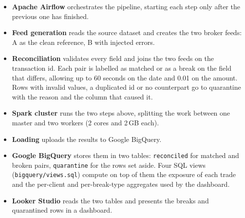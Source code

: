 \documentclass[11pt,a4paper]{article}
\newcommand{\code}[1]{\texttt{#1}}
\begin{document}
\begin{itemize}
  \item \textbf{Apache Airflow} orchestrates the pipeline, starting each step only after the previous one has finished.
  \item \textbf{Feed generation} reads the source dataset and creates the two broker feeds: A as the clean reference, B with injected errors.
  \item \textbf{Reconciliation} validates every field and joins the two feeds on the transaction id. Each pair is labelled as matched or as a break on the field that differs, allowing up to 60 seconds on the date and 0.01 on the amount. Rows with invalid values, a duplicated id or no counterpart go to quarantine with the reason and the column that caused it.
  \item \textbf{Spark cluster} runs the two steps above, splitting the work between one master and two workers (2 cores and 2\,GB each).
  \item \textbf{Loading} uploads the results to Google BigQuery.
  \item \textbf{Google BigQuery} stores them in two tables: \code{reconciled} for matched and broken pairs, \code{quarantine} for the rows set aside. Four SQL views (\code{bigquery/views.sql}) compute on top of them the exposure of each trade and the per-client and per-break-type aggregates used by the dashboard.
  \item \textbf{Looker Studio} reads the two tables and presents the breaks and quarantined rows in a dashboard.
\end{itemize}
\end{document}

